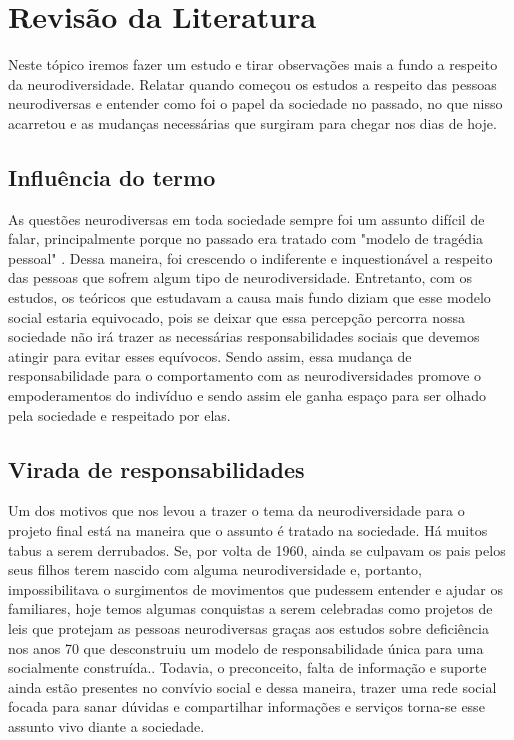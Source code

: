 \chapter{Revisão da Literatura}

Neste tópico iremos fazer um estudo e tirar observações mais a fundo a respeito da neurodiversidade. Relatar quando começou os estudos a respeito das pessoas neurodiversas e
entender como foi o papel da sociedade no passado, no que nisso acarretou e as mudanças necessárias que surgiram para chegar nos dias de hoje.

\section{Influência do termo}
As questões neurodiversas em toda sociedade sempre foi um assunto difícil de falar, principalmente porque no passado era tratado com "modelo de tragédia pessoal" \cite{oliver1990politics}. Dessa maneira, foi crescendo o indiferente e inquestionável a respeito das pessoas que sofrem algum tipo de neurodiversidade. Entretanto, com os estudos, os teóricos que estudavam a causa mais fundo diziam que esse modelo social estaria equivocado, pois se deixar que essa percepção percorra nossa sociedade não irá trazer as necessárias responsabilidades sociais que devemos atingir para evitar esses equívocos. Sendo assim, essa mudança de responsabilidade para o comportamento com as neurodiversidades promove o empoderamentos do indivíduo e sendo assim ele ganha espaço para ser olhado pela sociedade e respeitado por elas.

\section{Virada de responsabilidades}
Um dos motivos que nos levou a trazer o tema da neurodiversidade para o projeto final está na maneira que o assunto é tratado na sociedade. Há muitos tabus a serem derrubados. Se, por volta de 1960, ainda se culpavam os pais pelos seus filhos terem nascido com alguma neurodiversidade e, portanto, impossibilitava o surgimentos de movimentos que pudessem entender e ajudar os familiares, hoje temos algumas conquistas a serem celebradas como projetos de leis que protejam as pessoas neurodiversas graças aos estudos sobre deficiência nos anos 70 que desconstruiu um modelo de responsabilidade única para uma socialmente construída.\cite{ortega2008}. Todavia, o preconceito, falta de informação e suporte ainda estão presentes no convívio social e dessa maneira, trazer uma rede social focada para sanar dúvidas e compartilhar informações e serviços torna-se esse assunto vivo diante a sociedade.

